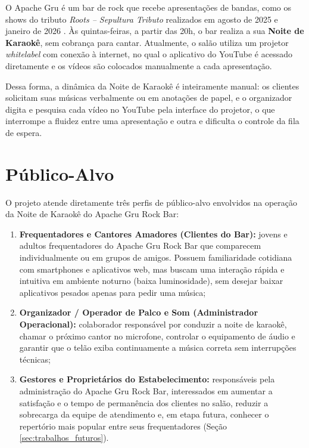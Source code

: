O Apache Gru é um bar de rock que recebe apresentações de bandas, como os shows do tributo \textit{Roots -- Sepultura Tributo} realizados em agosto de 2025 e janeiro de 2026 \cite{setlistfm2026}. Às quintas-feiras, a partir das 20h, o bar realiza a sua \textbf{Noite de Karaokê}, sem cobrança para cantar. Atualmente, o salão utiliza um projetor \textit{whitelabel} com conexão à internet, no qual o aplicativo do YouTube é acessado diretamente e os vídeos são colocados manualmente a cada apresentação.

Dessa forma, a dinâmica da Noite de Karaokê é inteiramente manual: os clientes solicitam suas músicas verbalmente ou em anotações de papel, e o organizador digita e pesquisa cada vídeo no YouTube pela interface do projetor, o que interrompe a fluidez entre uma apresentação e outra e dificulta o controle da fila de espera.

\section{Público-Alvo}

O projeto atende diretamente três perfis de público-alvo envolvidos na operação da Noite de Karaokê do Apache Gru Rock Bar:

\begin{enumerate}
  \item \textbf{Frequentadores e Cantores Amadores (Clientes do Bar):} jovens e adultos frequentadores do Apache Gru Rock Bar que comparecem individualmente ou em grupos de amigos. Possuem familiaridade cotidiana com smartphones e aplicativos web, mas buscam uma interação rápida e intuitiva em ambiente noturno (baixa luminosidade), sem desejar baixar aplicativos pesados apenas para pedir uma música;
  \item \textbf{Organizador / Operador de Palco e Som (Administrador Operacional):} colaborador responsável por conduzir a noite de karaokê, chamar o próximo cantor no microfone, controlar o equipamento de áudio e garantir que o telão exiba continuamente a música correta sem interrupções técnicas;
  \item \textbf{Gestores e Proprietários do Estabelecimento:} responsáveis pela administração do Apache Gru Rock Bar, interessados em aumentar a satisfação e o tempo de permanência dos clientes no salão, reduzir a sobrecarga da equipe de atendimento e, em etapa futura, conhecer o repertório mais popular entre seus frequentadores (Seção \ref{sec:trabalhos_futuros}).
\end{enumerate}

